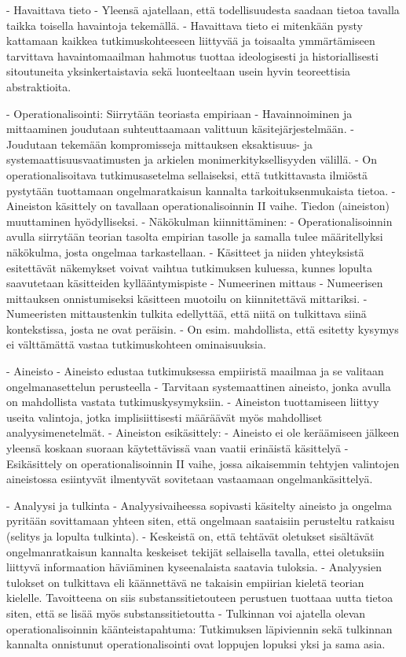 \documentclass[
]{book}
\begin{document}
\begin{itemize}
- Havaittava tieto
  - Yleensä ajatellaan, että todellisuudesta saadaan tietoa tavalla taikka toisella havaintoja tekemällä.
  - Havaittava tieto ei mitenkään pysty kattamaan kaikkea tutkimuskohteeseen liittyvää ja toisaalta ymmärtämiseen tarvittava havaintomaailman hahmotus tuottaa ideologisesti ja historiallisesti sitoutuneita yksinkertaistavia sekä luonteeltaan usein hyvin teoreettisia abstraktioita.

- Operationalisointi: Siirrytään teoriasta empiriaan
  - Havainnoiminen ja mittaaminen joudutaan suhteuttaamaan valittuun käsitejärjestelmään.
  - Joudutaan tekemään kompromisseja mittauksen eksaktisuus- ja systemaattisuusvaatimusten ja arkielen monimerkityksellisyyden välillä.
  - On operationalisoitava tutkimusasetelma sellaiseksi, että tutkittavasta ilmiöstä pystytään tuottamaan ongelmaratkaisun kannalta tarkoituksenmukaista tietoa.
  - Aineiston käsittely on tavallaan operationalisoinnin II vaihe. Tiedon (aineiston) muuttaminen hyödylliseksi.
  - Näkökulman kiinnittäminen:
    - Operationalisoinnin avulla siirrytään teorian tasolta empirian tasolle ja samalla tulee määritellyksi näkökulma, josta ongelmaa tarkastellaan.
    - Käsitteet ja niiden yhteyksistä esitettävät näkemykset voivat vaihtua tutkimuksen kuluessa, kunnes lopulta saavutetaan käsitteiden kyllääntymispiste
  - Numeerinen mittaus
    - Numeerisen mittauksen onnistumiseksi käsitteen muotoilu on kiinnitettävä mittariksi.
    - Numeeristen mittaustenkin tulkita edellyttää, että niitä on tulkittava siinä kontekstissa, josta ne ovat peräisin.
    - On esim. mahdollista, että esitetty kysymys ei välttämättä vastaa tutkimuskohteen ominaisuuksia.

- Aineisto
  - Aineisto edustaa tutkimuksessa empiiristä maailmaa ja se valitaan ongelmanasettelun perusteella
  - Tarvitaan systemaattinen aineisto, jonka avulla on mahdollista vastata tutkimuskysymyksiin.
  - Aineiston tuottamiseen liittyy useita valintoja, jotka implisiittisesti määräävät myös mahdolliset analyysimenetelmät.
  - Aineiston esikäsittely: 
    - Aineisto ei ole keräämiseen jälkeen yleensä koskaan suoraan käytettävissä vaan vaatii erinäistä käsittelyä 
    - Esikäsittely on operationalisoinnin II vaihe, jossa aikaisemmin tehtyjen valintojen aineistossa esiintyvät ilmentyvät sovitetaan vastaamaan ongelmankäsittelyä.

- Analyysi ja tulkinta
  - Analyysivaiheessa sopivasti käsitelty aineisto ja ongelma pyritään sovittamaan yhteen siten, että ongelmaan saataisiin perusteltu ratkaisu (selitys ja lopulta tulkinta).
  - Keskeistä on, että tehtävät oletukset sisältävät ongelmanratkaisun kannalta keskeiset tekijät sellaisella tavalla, ettei oletuksiin liittyvä informaation häviäminen kyseenalaista saatavia tuloksia.
  - Analyysien tulokset on tulkittava eli käännettävä ne takaisin empiirian kieletä teorian kielelle. Tavoitteena on siis substanssitietouteen perustuen tuottaaa uutta tietoa siten, että se lisää myös substanssitietoutta
  - Tulkinnan voi ajatella olevan operationalisoinnin käänteistapahtuma: Tutkimuksen läpiviennin sekä tulkinnan kannalta onnistunut operationalisointi ovat loppujen lopuksi yksi ja sama asia.


\end{itemize}
\end{document}
